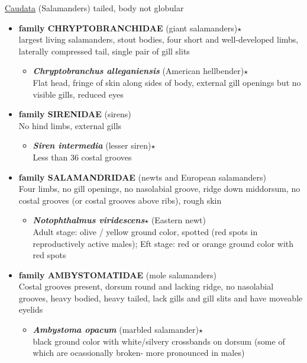 \documentclass[a4paper,12pt]{article}
\begin{document}
\begin{description}
\item{\underline{{\LARGE{Caudata}}}}
(Salamanders) tailed, body not globular
\begin{itemize}
  \item{\textbf{family CHRYPTOBRANCHIDAE} (giant salamanders)$\star$} \\ largest living salamanders, stout bodies, four short and well-developed limbs, laterally compressed tail, single pair of gill slits
  \begin{itemize}
    \item{\textbf{\textit{Chryptobranchus alleganiensis}} (American hellbender)$\star$} \\ Flat head, fringe of skin along sides of body, external gill openings but no visible gills, reduced eyes
  \end{itemize}
  \item{\textbf{family SIRENIDAE} (sirens)} \\ No hind limbs, external gills
  \begin{itemize}
    \item{\textbf{\textit{Siren intermedia}} (lesser siren)$\star$} \\ Less than 36 costal grooves
  \end{itemize}  
  \item{\textbf{family SALAMANDRIDAE} (newts and European salamanders)} \\ Four limbs, no gill openings, no nasolabial groove, ridge down middorsum, no costal grooves (or costal grooves above ribs), rough skin
  \begin{itemize}
    \item{\textbf{\textit{Notophthalmus viridescens}$\star$} (Eastern newt)} \\ Adult stage: olive / yellow ground color, spotted (red spots in reproductively active males); Eft stage: red or orange ground color with red spots
  \end{itemize}
  \item{\textbf{family AMBYSTOMATIDAE} (mole salamanders)} \\ Costal grooves present, dorsum round and lacking ridge, no nasolabial grooves, heavy bodied, heavy tailed, lack gills and gill slits and have moveable eyelids
  \begin{itemize}
    \item{\textbf{\textit{Ambystoma opacum}} (marbled salamander)$\star$} \\ black ground color with white/silvery crossbands on dorsum (some of which are ocassionally broken- more pronounced in males)

\end{itemize}
\end{itemize}
\end{description}
\end{document}
